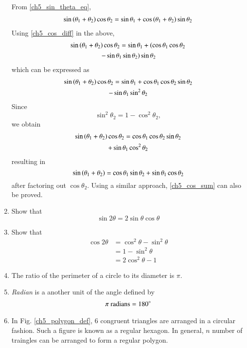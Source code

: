 \begin{enumerate}[label=\arabic*.,ref=\thesubsection.\theenumi]
%
\solution From \eqref{ch5_sin_theta_eq},
%
\begin{align}
 \sin \left(\theta_1 + \theta_2\right)\cos \theta_2 =\sin  \theta_1 +\cos\left(\theta_1+\theta_2\right)\sin\theta_2 
\end{align}
%
Using \eqref{ch5_cos_diff} in the above,
%
\begin{multline}
\sin \left(\theta_1 + \theta_2\right)\cos \theta_2 
=\sin  \theta_1 +\left(\cos \theta_1\cos\theta_2 \right.
\\	
\left.	- \sin \theta_1\sin\theta_2\right)\sin\theta_2 
\end{multline}
%
which can be expressed as
%
\begin{multline}
\sin \left(\theta_1 + \theta_2\right)\cos \theta_2 
=\sin  \theta_1 +\cos \theta_1\cos\theta_2 \sin\theta_2 
\\	
	- \sin \theta_1\sin^2\theta_2
\end{multline}
%
Since
%
\begin{equation}
\sin^2\theta_2 = 1- \cos^2\theta_2, 
\end{equation}
%
we obtain
%
\begin{multline}
\sin \left(\theta_1 + \theta_2\right)\cos \theta_2 
=\cos \theta_1\cos\theta_2 \sin\theta_2 
\\	
+ \sin \theta_1\cos^2\theta_2
\end{multline}
%
resulting in
%
\begin{equation}
\sin \left(\theta_1 + \theta_2\right)
=\cos \theta_1 \sin\theta_2 
+ \sin \theta_1\cos\theta_2
\end{equation}
%
after factoring out $\cos \theta_2$.  Using a similar approach, \eqref{ch5_cos_sum} can also be proved.
%
\item
	Show that
	\begin{equation}
	\label{eq:sin2theta}
	\sin 2\theta = 2 \sin\theta \cos\theta
	\end{equation}
%
\item
	Show that
	\begin{align}
	\label{eq:cos2theta_cos_sin}
	\cos 2\theta &= \cos^2\theta -\sin^2\theta 
\\
	\label{eq:cos2theta_sin_sq}
&= 1 - \sin^2\theta
\\
&=2\cos^2\theta -1
	\label{eq:cos2theta_cos_sq}
	\end{align}
\item The ratio of the perimeter of a circle to its diameter is $\pi$.
\label{prob:circ_peri_dia}
\item {\em Radian} is a another unit of the angle defined by
%
\begin{align}
\pi \text{ radians} = 180 \degree
\end{align}
%
\item
	In Fig. \ref{ch5_polygon_def}, 6 congruent triangles are arranged in a circular fashion.  Such a figure is known as a regular hexagon.  In general, $n$ number of traingles can be arranged to form a regular polygon.
\begin{figure}[!ht]
	\begin{center}
		

\end{center}
\end{figure}
\end{enumerate}

